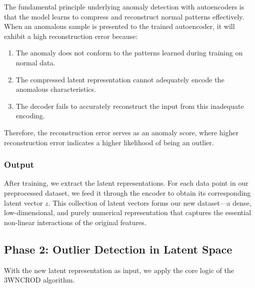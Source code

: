 \documentclass[12pt,a4paper]{article}
\begin{document}
The fundamental principle underlying anomaly detection with autoencoders is that the model learns to compress and reconstruct normal patterns effectively. When an anomalous sample is presented to the trained autoencoder, it will exhibit a high reconstruction error because:

\begin{enumerate}
\item The anomaly does not conform to the patterns learned during training on normal data.
\item The compressed latent representation cannot adequately encode the anomalous characteristics.
\item The decoder fails to accurately reconstruct the input from this inadequate encoding.
\end{enumerate}

Therefore, the reconstruction error serves as an anomaly score, where higher reconstruction error indicates a higher likelihood of being an outlier.

\subsubsection{Output}

After training, we extract the latent representations. For each data point in our preprocessed dataset, we feed it through the encoder to obtain its corresponding latent vector $z$. This collection of latent vectors forms our new dataset—a dense, low-dimensional, and purely numerical representation that captures the essential non-linear interactions of the original features.

\subsection{Phase 2: Outlier Detection in Latent Space}

With the new latent representation as input, we apply the core logic of the 3WNCROD algorithm.
\end{document}
